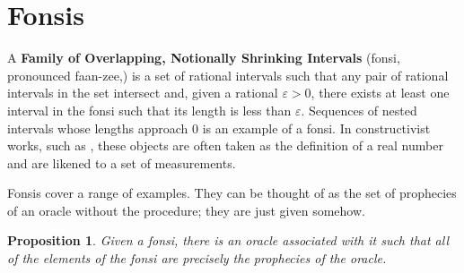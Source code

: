 \documentclass[12pt]{article}
\newtheorem{proposition}{Proposition}[section]
\begin{document}
\section{Fonsis}\label{os:fonsis}

 A \textbf{Family of Overlapping, Notionally Shrinking Intervals} (fonsi, pronounced faan-zee,) is a set of rational intervals such that any pair of rational intervals in the set intersect and, given a rational $\varepsilon >0$, there exists at least one interval in the fonsi such that its length is less than $\varepsilon$. Sequences of nested intervals whose lengths approach 0 is an example of a fonsi. In constructivist works, such as \cite{bridger}, these objects are often taken as the definition of a real number and are likened to a set of measurements. 

Fonsis cover a range of examples. They can be thought of as the set of prophecies of an oracle without the procedure; they are just given somehow. 

\begin{proposition}
    Given a fonsi, there is an oracle associated with it such that all of the elements of the fonsi are precisely the prophecies of the oracle. 
\end{proposition}
\end{document}
